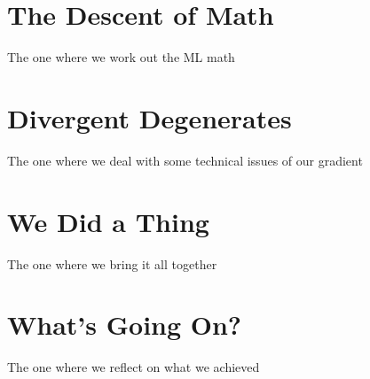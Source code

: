 \documentclass[10pt,a4paper]{article}
\begin{document}
\section{The Descent of Math}
The one where we work out the ML math
\section{Divergent Degenerates}
The one where we deal with some technical issues of our gradient
\section{We Did a Thing}
The one where we bring it all together
\section{What's Going On?}
The one where we reflect on what we achieved
\newpage


\end{document}
